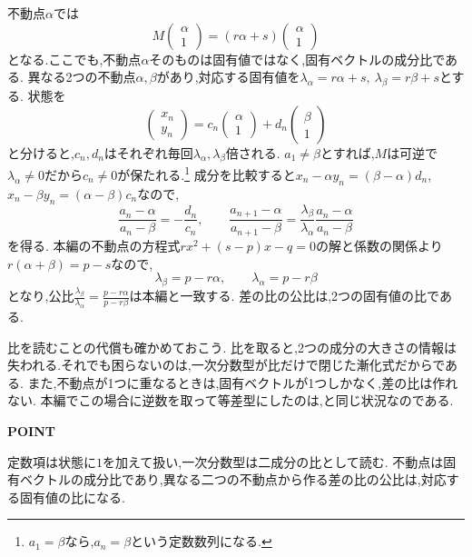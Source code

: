 不動点$\alpha$では
\[
  M\begin{pmatrix}\alpha\\1\end{pmatrix}
  =(r\alpha+s)\begin{pmatrix}\alpha\\1\end{pmatrix}
\]
となる.ここでも,不動点$\alpha$そのものは固有値ではなく,固有ベクトルの成分比である.
異なる2つの不動点$\alpha,\beta$があり,対応する固有値を$\lambda_\alpha=r\alpha+s,\ \lambda_\beta=r\beta+s$とする.
状態を
\[
  \begin{pmatrix}x_n\\y_n\end{pmatrix}
  =c_n\begin{pmatrix}\alpha\\1\end{pmatrix}
  +d_n\begin{pmatrix}\beta\\1\end{pmatrix}
\]
と分けると,$c_n,d_n$はそれぞれ毎回$\lambda_\alpha,\lambda_\beta$倍される.
$a_1\ne\beta$とすれば,$M$は可逆で$\lambda_\alpha\ne0$だから$c_n\ne0$が保たれる.\footnote{$a_1=\beta$なら,$a_n=\beta$という定数数列になる.}
成分を比較すると$x_n-\alpha y_n=(\beta-\alpha)d_n$,$x_n-\beta y_n=(\alpha-\beta)c_n$なので,
\[
  \frac{a_n-\alpha}{a_n-\beta}=-\frac{d_n}{c_n},
  \qquad
  \frac{a_{n+1}-\alpha}{a_{n+1}-\beta}
  =\frac{\lambda_\beta}{\lambda_\alpha}
  \frac{a_n-\alpha}{a_n-\beta}
\]
を得る.
本編の不動点の方程式$rx^2+(s-p)x-q=0$の解と係数の関係より$r(\alpha+\beta)=p-s$なので,
\[
  \lambda_\beta=p-r\alpha,\qquad
  \lambda_\alpha=p-r\beta
\]
となり,公比$\frac{\lambda_\beta}{\lambda_\alpha}=\frac{p-r\alpha}{p-r\beta}$は本編と一致する.
差の比の公比は,2つの固有値の比である.

比を読むことの代償も確かめておこう.
比を取ると,2つの成分の大きさの情報は失われる.それでも困らないのは,一次分数型が比だけで閉じた漸化式だからである.
また,不動点が1つに重なるときは,固有ベクトルが1つしかなく,差の比は作れない.
本編でこの場合に逆数を取って等差型にしたのは,と同じ状況なのである.

\begin{bookpoint}
  \textbf{POINT}\par
  定数項は状態に$1$を加えて扱い,一次分数型は二成分の比として読む.
  不動点は固有ベクトルの成分比であり,異なる二つの不動点から作る差の比の公比は,対応する固有値の比になる.
\end{bookpoint}

